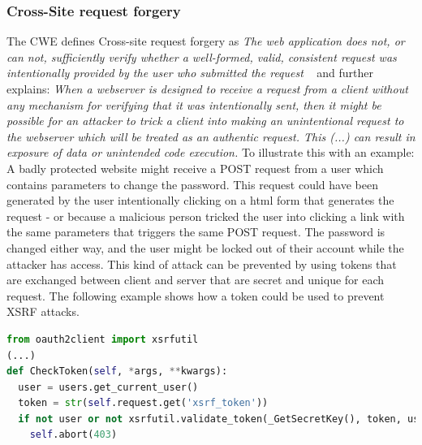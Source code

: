 \documentclass[
	a4paper,
	pagesize,
	pdftex,
	12pt,
	twoside, %
	BCOR=5mm, %
	ngerman,
	fleqn,
	final,
	]{scrartcl}
\begin{document}
\subsubsection{Cross-Site request forgery}
The CWE defines Cross-site request forgery as \textit{The web application does not, or can not, sufficiently verify whether a well-formed, valid, consistent request was intentionally provided by the user who submitted the request} ~\cite{CommonWeaknessEnumeration.19.9.2019b} and further explains: \textit{When a webserver is designed to receive a request from a client without any mechanism for verifying that it was intentionally sent, then it might be possible for an attacker to trick a client into making an unintentional request to the webserver which will be treated as an authentic request. This (...) can result in exposure of data or unintended code execution.} To illustrate this with an example: A badly protected website might receive a POST request from a user which contains parameters to change the password. This request could have been generated by the user intentionally clicking on a html form that generates the request - or because a malicious person tricked the user into clicking a link with the same parameters that triggers the same POST request. The password is changed either way, and the user might be locked out of their account while the attacker has access. This kind of attack can be prevented by using tokens that are exchanged between client and server that are secret and unique for each request. The following example shows how a token could be used to prevent XSRF attacks.
\begin{lstlisting}[language=Python, showstringspaces=False]
from oauth2client import xsrfutil
(...)
def CheckToken(self, *args, **kwargs):
  user = users.get_current_user()
  token = str(self.request.get('xsrf_token'))
  if not user or not xsrfutil.validate_token(_GetSecretKey(), token, user.user_id()):
    self.abort(403)
  
\end{lstlisting}
\end{document}
